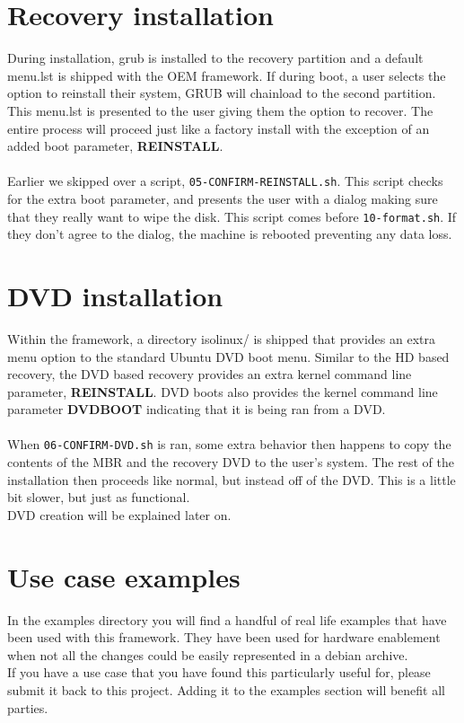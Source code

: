\documentclass[letterpaper,10pt,titlepage]{article}
\begin{document}
\section{Recovery installation}
During installation, grub is installed to the recovery partition and a default menu.lst is shipped with the OEM framework.   If during boot, a user selects the option to reinstall their system, GRUB will chainload to the second partition.  This menu.lst is presented to the user giving them the option to recover.  The entire process will proceed just like a factory install with the exception of an added boot parameter, \textbf{REINSTALL}.
\\
\\
Earlier we skipped over a script, \texttt{05-CONFIRM-REINSTALL.sh}.  This script checks for the extra boot parameter, and presents the user with a dialog making sure that they really want to wipe the disk.  This script comes before \texttt{10-format.sh}.  If they don't agree to the dialog, the machine is rebooted preventing any data loss.

\section{DVD installation}
Within the framework, a directory isolinux/ is shipped that provides an extra menu option to the standard Ubuntu DVD boot menu.
Similar to the HD based recovery, the DVD based recovery provides an extra kernel command line parameter, \textbf{REINSTALL}.
DVD boots also provides the kernel command line parameter \textbf{DVDBOOT} indicating that it is being ran from a DVD.  
\\
\\
When \texttt{06-CONFIRM-DVD.sh} is ran, some extra behavior then happens to copy the contents of the MBR and the recovery DVD to the user's system.  The rest of the installation then proceeds like normal, but instead off of the DVD.  This is a little bit slower, but just as functional.
\\
DVD creation will be explained later on.


\section{Use case examples}
In the examples directory you will find a handful of real life examples that have been used with this framework.  They have been used for hardware enablement when not all the changes could be easily represented in a debian archive.
\\
If you have a use case that you have found this particularly useful for, please submit it back to this project.  Adding it to the examples section will benefit all parties.
\end{document}

